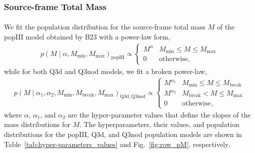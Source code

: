 \documentclass[a4paper,12pt]{article}
\begin{document}
\subsubsection{Source-frame Total Mass}

\paragraph{}
We fit the population distribution for the source-frame total mass $M$ of the popIII model obtained by B23 with a power-law form,
\begin{align}
p(M \mid \alpha,M_{\min},M_{\max})_{\mathrm{popIII}}
\propto 
\begin{cases}
M^{\alpha} & M_{\min} \le M \le M_{\mathrm{max}}\\
0 & \mathrm{otherwise},
\end{cases}
\label{eq:mass_distr_popIII}
\end{align}
while for both Q3d and Q3nod models, we fit a broken power-law,
\begin{align}
p(M \mid \alpha_1,\alpha_2,M_{\min},M_{\mathrm{break}},M_{\max})_{\mathrm{Q3d,Q3nod}}
\propto
\begin{cases}
M^{\alpha_1} & M_{\min} \le M \le M_{\mathrm{break}}\\[6pt]
M^{\alpha_2} & M_{\mathrm{break}} < M \le M_{\max}\\
0 & \mathrm{otherwise},
\end{cases}
\label{eq:mass_distr_Q3}
\end{align}
where $\alpha$, $\alpha_1$, and $\alpha_2$ are the hyper-parameter values that define the slopes of the mass distributions for $M$. The hyperparameters, their values, and population distributions for the popIII, Q3d, and Q3nod population models are shown in Table~\ref{tab:hyper-parameters_values} and Fig.~\ref{fig:row_pM}, respectively.
\\
\FloatBarrier
\end{document}
